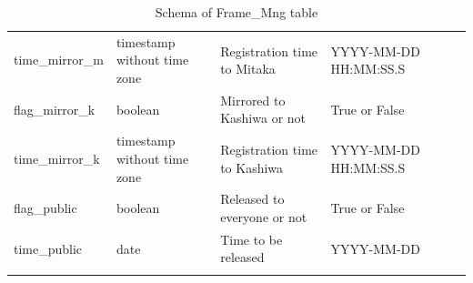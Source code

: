 \documentclass[12pt]{article}
\begin{document}
\begin{table}[thbp]
\begin{center}
{\begin{tabular}{llllll}
time\_mirror\_m & timestamp without time zone & Registration time to Mitaka                         & YYYY-MM-DD HH:MM:SS.S      &             &   \\
flag\_mirror\_k & boolean & Mirrored to Kashiwa or not                          & True or False              &             &   \\
time\_mirror\_k & timestamp without time zone & Registration time to Kashiwa                        & YYYY-MM-DD HH:MM:SS.S      &             &   \\
flag\_public & boolean & Released to everyone or not                         & True or False              &             &   \\
time\_public & date & Time to be released                                 & YYYY-MM-DD                 &             &   \\
\hline\\
\end{tabular}
}
\caption{Schema of Frame\_Mng table}
\end{center}
\end{table}

\begin{table}[thbp]
\begin{center}
\caption{Schema of Frame\_Hpx11 table}
\end{center}
\end{table}
\end{document}
